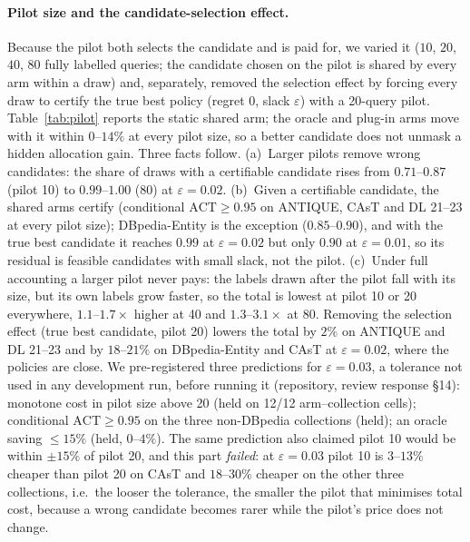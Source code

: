 \documentclass{article}
\newcommand{\eps}{\varepsilon}
\newcommand{\ACT}{\mathrm{ACT}}
\begin{document}
\paragraph{Pilot size and the candidate-selection effect.} Because the pilot both selects the candidate and is paid for, we varied it ($10$, $20$, $40$, $80$ fully labelled queries; the candidate chosen on the pilot is shared by every arm within a draw) and, separately, removed the selection effect by forcing every draw to certify the true best policy (regret $0$, slack $\eps$) with a 20-query pilot. Table~\ref{tab:pilot} reports the static shared arm; the oracle and plug-in arms move with it within $0$--$14\%$ at every pilot size, so a better candidate does not unmask a hidden allocation gain. Three facts follow. (a)~Larger pilots remove wrong candidates: the share of draws with a certifiable candidate rises from $0.71$--$0.87$ (pilot 10) to $0.99$--$1.00$ (80) at $\eps=0.02$. (b)~Given a certifiable candidate, the shared arms certify (conditional $\ACT\ge0.95$ on ANTIQUE, CAsT and DL 21--23 at every pilot size); DBpedia-Entity is the exception ($0.85$--$0.90$), and with the true best candidate it reaches $0.99$ at $\eps=0.02$ but only $0.90$ at $\eps=0.01$, so its residual is feasible candidates with small slack, not the pilot. (c)~Under full accounting a larger pilot never pays: the labels drawn after the pilot fall with its size, but its own labels grow faster, so the total is lowest at pilot 10 or 20 everywhere, $1.1$--$1.7\times$ higher at 40 and $1.3$--$3.1\times$ at 80. Removing the selection effect (true best candidate, pilot 20) lowers the total by $2\%$ on ANTIQUE and DL 21--23 and by $18$--$21\%$ on DBpedia-Entity and CAsT at $\eps=0.02$, where the policies are close. We pre-registered three predictions for $\eps=0.03$, a tolerance not used in any development run, before running it (repository, review response \S14): monotone cost in pilot size above 20 (held on 12/12 arm--collection cells); conditional $\ACT\ge0.95$ on the three non-DBpedia collections (held); an oracle saving $\le15\%$ (held, $0$--$4\%$). The same prediction also claimed pilot 10 would be within $\pm15\%$ of pilot 20, and this part \emph{failed}: at $\eps=0.03$ pilot 10 is $3$--$13\%$ cheaper than pilot 20 on CAsT and $18$--$30\%$ cheaper on the other three collections, i.e.\ the looser the tolerance, the smaller the pilot that minimises total cost, because a wrong candidate becomes rarer while the pilot's price does not change.
\end{document}

